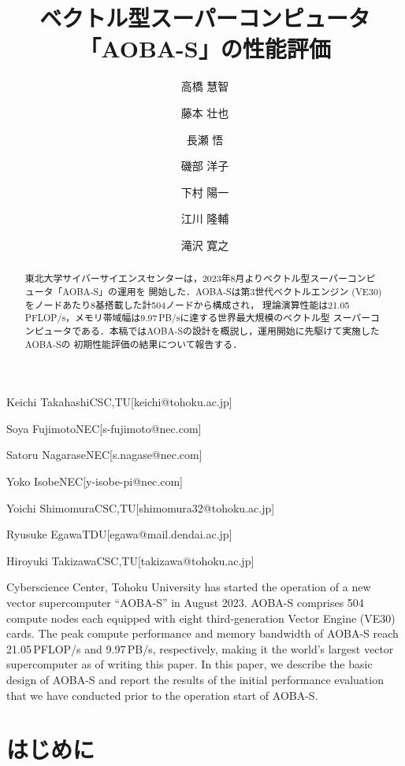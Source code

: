 ﻿\documentclass[submit,techrep,noauthor]{ipsj}
\begin{document}
\title{ベクトル型スーパーコンピュータ「AOBA-S」の性能評価}



\author{高橋 慧智}{Keichi Takahashi}{CSC,TU}[keichi@tohoku.ac.jp]
\author{藤本 壮也}{Soya Fujimoto}{NEC}[s-fujimoto@nec.com]
\author{長瀬 悟}{Satoru Nagarase}{NEC}[s.nagase@nec.com]
\author{磯部 洋子}{Yoko Isobe}{NEC}[y-isobe-pi@nec.com]
\author{下村 陽一}{Yoichi Shimomura}{CSC,TU}[shimomura32@tohoku.ac.jp]
\author{江川 隆輔}{Ryusuke Egawa}{TDU}[egawa@mail.dendai.ac.jp]
\author{滝沢 寛之}{Hiroyuki Takizawa}{CSC,TU}[takizawa@tohoku.ac.jp]

\begin{abstract}
東北大学サイバーサイエンスセンターは，2023年8月よりベクトル型スーパーコンピュータ「AOBA-S」の運用を
開始した．AOBA-Sは第3世代ベクトルエンジン (VE30) をノードあたり8基搭載した計504ノードから構成され，
理論演算性能は21.05\,PFLOP/s，メモリ帯域幅は9.97\,PB/sに達する世界最大規模のベクトル型
スーパーコンピュータである．本稿ではAOBA-Sの設計を概説し，運用開始に先駆けて実施したAOBA-Sの
初期性能評価の結果について報告する．
\end{abstract}

\begin{eabstract}
Cyberscience Center, Tohoku University has started the operation of a new vector supercomputer 
``AOBA-S'' in August 2023. AOBA-S comprises 504 compute nodes each equipped with eight
third-generation Vector Engine (VE30) cards. The peak compute performance and memory bandwidth of
AOBA-S reach 21.05\,PFLOP/s and 9.97\,PB/s, respectively, making it the world's largest vector
supercomputer as of writing this paper. In this paper, we describe the basic design of AOBA-S and
report the results of the initial performance evaluation that we have conducted prior to the
operation start of AOBA-S.
\end{eabstract}

\maketitle

\section{はじめに}
\end{document}
